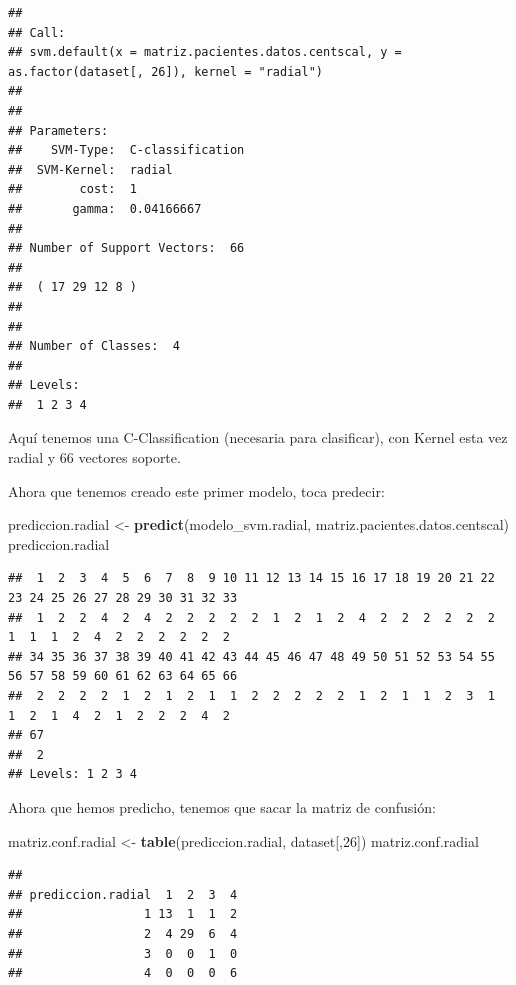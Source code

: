 \documentclass[]{article}
\newenvironment{Shaded}{\begin{snugshade}}{\end{snugshade}}
\newcommand{\KeywordTok}[1]{\textcolor[rgb]{0.13,0.29,0.53}{\textbf{#1}}}
\newcommand{\DecValTok}[1]{\textcolor[rgb]{0.00,0.00,0.81}{#1}}
\newcommand{\StringTok}[1]{\textcolor[rgb]{0.31,0.60,0.02}{#1}}
\newcommand{\NormalTok}[1]{#1}
\begin{document}
\begin{verbatim}
## 
## Call:
## svm.default(x = matriz.pacientes.datos.centscal, y = as.factor(dataset[, 26]), kernel = "radial")
## 
## 
## Parameters:
##    SVM-Type:  C-classification 
##  SVM-Kernel:  radial 
##        cost:  1 
##       gamma:  0.04166667 
## 
## Number of Support Vectors:  66
## 
##  ( 17 29 12 8 )
## 
## 
## Number of Classes:  4 
## 
## Levels: 
##  1 2 3 4
\end{verbatim}

Aquí tenemos una C-Classification (necesaria para clasificar), con
Kernel esta vez radial y 66 vectores soporte.

Ahora que tenemos creado este primer modelo, toca predecir:

\begin{Shaded}
\begin{Highlighting}[]
\NormalTok{prediccion.radial <-}\StringTok{ }\KeywordTok{predict}\NormalTok{(modelo_svm.radial, matriz.pacientes.datos.centscal)}
\NormalTok{prediccion.radial}
\end{Highlighting}
\end{Shaded}

\begin{verbatim}
##  1  2  3  4  5  6  7  8  9 10 11 12 13 14 15 16 17 18 19 20 21 22 23 24 25 26 27 28 29 30 31 32 33 
##  1  2  2  4  2  4  2  2  2  2  2  1  2  1  2  4  2  2  2  2  2  2  1  1  1  2  4  2  2  2  2  2  2 
## 34 35 36 37 38 39 40 41 42 43 44 45 46 47 48 49 50 51 52 53 54 55 56 57 58 59 60 61 62 63 64 65 66 
##  2  2  2  2  1  2  1  2  1  1  2  2  2  2  2  1  2  1  1  2  3  1  1  2  1  4  2  1  2  2  2  4  2 
## 67 
##  2 
## Levels: 1 2 3 4
\end{verbatim}

Ahora que hemos predicho, tenemos que sacar la matriz de confusión:

\begin{Shaded}
\begin{Highlighting}[]
\NormalTok{matriz.conf.radial <-}\StringTok{ }\KeywordTok{table}\NormalTok{(prediccion.radial, dataset[,}\DecValTok{26}\NormalTok{])}
\NormalTok{matriz.conf.radial}
\end{Highlighting}
\end{Shaded}

\begin{verbatim}
##                  
## prediccion.radial  1  2  3  4
##                 1 13  1  1  2
##                 2  4 29  6  4
##                 3  0  0  1  0
##                 4  0  0  0  6
\end{verbatim}
\end{document}

